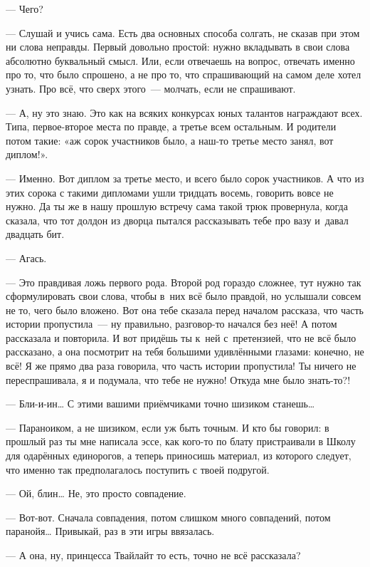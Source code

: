 \documentclass[fontsize=11pt,a5paper,titlepage=firstcover]{scrbook}
\begin{document}
--- Чего?

--- Слушай и учись сама. Есть два основных способа солгать, не сказав при этом ни слова неправды. Первый довольно простой: нужно вкладывать в свои слова абсолютно буквальный смысл. Или, если отвечаешь на вопрос, отвечать именно про то, что было спрошено, а не про то, что спрашивающий на самом деле хотел узнать. Про всё, что сверх этого~--- молчать, если не спрашивают.

--- А, ну это знаю. Это как на всяких конкурсах юных талантов награждают всех. Типа, первое-второе места по правде, а третье всем остальным. И родители потом такие: «аж сорок участников было, а наш-то третье место занял, вот диплом!».

--- Именно. Вот диплом за третье место, и всего было сорок участников. А что из этих сорока с такими дипломами ушли тридцать восемь, говорить вовсе не нужно. Да ты же в нашу прошлую встречу сама такой трюк провернула, когда сказала, что тот долдон из дворца пытался рассказывать тебе про вазу и~давал двадцать бит.

--- Агась.

--- Это правдивая ложь первого рода. Второй род гораздо сложнее, тут нужно так сформулировать свои слова, чтобы в~них всё было правдой, но услышали совсем не то, чего было вложено. Вот она тебе сказала перед началом рассказа, что часть истории пропустила~--- ну правильно, разговор-то начался без неё! А потом рассказала и повторила. И вот придёшь ты к~ней с~претензией, что не всё было рассказано, а она посмотрит на тебя большими удивлёнными глазами: конечно, не всё! Я же прямо два раза говорила, что часть истории пропустила! Ты ничего не переспрашивала, я и подумала, что тебе не нужно! Откуда мне было знать-то?!

--- Бли-и-ин{\ldots} С этими вашими приёмчиками точно шизиком станешь{\ldots}

--- Параноиком, а не шизиком, если уж быть точным. И кто бы говорил: в прошлый раз ты мне написала эссе, как кого-то по блату пристраивали в Школу для одарённых единорогов, а теперь приносишь материал, из которого следует, что именно так предполагалось поступить с твоей подругой.

--- Ой, блин{\ldots} Не, это просто совпадение.

--- Вот-вот. Сначала совпадения, потом слишком много совпадений, потом паранойя{\ldots} Привыкай, раз в эти игры ввязалась.

--- А она, ну, принцесса Твайлайт то есть, точно не всё рассказала?
\end{document}
